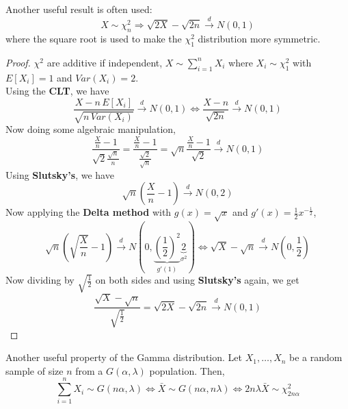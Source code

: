 Another useful result is often used:
\begin{equation*}
    X \sim \chi^2_n \Rightarrow \sqrt{2X} - \sqrt{2n} \xrightarrow{d} N(0,1)
\end{equation*}
where the square root is used to make the $\chi^2_1$ distribution more symmetric.
\begin{proof}
    $\chi^2$ are additive if independent, $X\sim \sum_{i=1}^{n} X_i$ where $X_i\sim \chi^2_1$ with $E[X_i] = 1$ and $Var(X_i) = 2$.\\

    Using the \textbf{CLT}, we have
    \begin{equation*}
        \frac{X-n\, E[X_i]}{\sqrt{n\, Var(X_i)}}\xrightarrow{d} N(0,1) \Leftrightarrow
        \frac{X - n}{\sqrt{2n}}\xrightarrow{d} N(0,1)
    \end{equation*}
    Now doing some algebraic manipulation,
    \begin{equation*}
        \frac{\frac{X}{n}-1}{\sqrt{2}\frac{\sqrt{n}}{n}} = \frac{\frac{X}{n}-1}{\frac{\sqrt{2}}{\sqrt{n}}} = \sqrt{n}\frac{\frac{X}{n}-1}{\sqrt{2}}\xrightarrow{d}N(0,1)
    \end{equation*}
    Using \textbf{Slutsky's}, we have
    \begin{equation*}
        \sqrt{n}\left(\frac{X}{n} - 1\right) \xrightarrow{d} N(0,2)
    \end{equation*}
    Now applying the \textbf{Delta method} with $g(x) = \sqrt{x}$ and $g'(x) = \frac{1}{2}x^{-\frac{1}{2}}$,
    \begin{equation*}
        \sqrt{n}\left(\sqrt{\frac{X}{n}}-1\right)\xrightarrow{d}N\left(0, \underbrace{\left(\frac{1}{2}\right)^2}_{g'(1)}\underbrace{2}_{\sigma^2}\right)
        \Leftrightarrow \sqrt{X}-\sqrt{n}\xrightarrow{d}N\left(0,\frac{1}{2}\right)
    \end{equation*}
    Now dividing by $\sqrt{\frac{1}{2}}$ on both sides and using \textbf{Slutsky's} again, we get
    \begin{equation*}
        \frac{\sqrt{X}-\sqrt{n}}{\sqrt{\frac{1}{2}}} = \sqrt{2X} - \sqrt{2n} \xrightarrow{d} N(0,1)
    \end{equation*}
\end{proof}
Another useful property of the Gamma distribution. Let $X_1,\ldots,X_n$ be a random sample of size $n$ from a $G(\alpha,\lambda)$ population.
Then,
\begin{equation*}
    \sum_{i=1}^{n} X_i\sim G(n\alpha, \lambda) \Leftrightarrow \bar{X}\sim G(n\alpha, n\lambda) \Leftrightarrow 2n\lambda\bar{X}\sim \chi^2_{2n\alpha}
\end{equation*}


